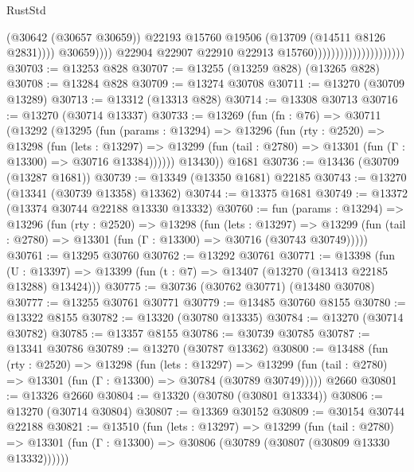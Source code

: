 \begin{lexlean}{RustStd}
\begin{coremodule}
                                                          (@30642 (@30657 @30659))
                                                          @22193
                                                          @15760
                                                          @19506
                                                          (@13709 (@14511 @8126 @2831))))
                                                      @30659))))
                                              @22904
                                              @22907
                                              @22910
                                              @22913
                                              @15760)))))))))))))))))))))
@30703 := @13253 @828
@30707 := @13255 (@13259 @828) (@13265 @828)
@30708 := @13284 @828
@30709 := @13274 @30708
@30711 := @13270 (@30709 @13289)
@30713 := @13312 (@13313 @828)
@30714 := @13308 @30713
@30716 := @13270 (@30714 @13337)
@30733 := @13269
    (fun (fn : @76) =>
    @30711
      (@13292
        (@13295
          (fun (params : @13294) =>
          @13296
            (fun (rty : @2520) =>
            @13298
              (fun (lets : @13297) =>
              @13299 (fun (tail : @2780) => @13301 (fun (Γ : @13300) => @30716 @13384))))))
        @13430))
    @1681
@30736 := @13436 (@30709 (@13287 @1681))
@30739 := @13349 (@13350 @1681) @22185
@30743 := @13270 (@13341 (@30739 @13358) @13362)
@30744 := @13375 @1681
@30749 := @13372 (@13374 @30744 @22188 @13330 @13332)
@30760 := fun (params : @13294) =>
  @13296
    (fun (rty : @2520) =>
    @13298
      (fun (lets : @13297) =>
      @13299 (fun (tail : @2780) => @13301 (fun (Γ : @13300) => @30716 (@30743 @30749)))))
@30761 := @13295 @30760
@30762 := @13292 @30761
@30771 := @13398
    (fun (U : @13397) => @13399 (fun (t : @7) => @13407 (@13270 (@13413 @22185 @13288) @13424)))
@30775 := @30736 (@30762 @30771) (@13480 @30708)
@30777 := @13255 @30761 @30771
@30779 := @13485 @30760 @8155
@30780 := @13322 @8155
@30782 := @13320 (@30780 @13335)
@30784 := @13270 (@30714 @30782)
@30785 := @13357 @8155
@30786 := @30739 @30785
@30787 := @13341 @30786
@30789 := @13270 (@30787 @13362)
@30800 := @13488
    (fun (rty : @2520) =>
    @13298
      (fun (lets : @13297) =>
      @13299 (fun (tail : @2780) => @13301 (fun (Γ : @13300) => @30784 (@30789 @30749)))))
    @2660
@30801 := @13326 @2660
@30804 := @13320 (@30780 (@30801 @13334))
@30806 := @13270 (@30714 @30804)
@30807 := @13369 @30152
@30809 := @30154 @30744 @22188
@30821 := @13510
    (fun (lets : @13297) =>
    @13299
      (fun (tail : @2780) =>
      @13301 (fun (Γ : @13300) => @30806 (@30789 (@30807 (@30809 @13330 @13332))))))

\end{coremodule}
\end{lexlean}
